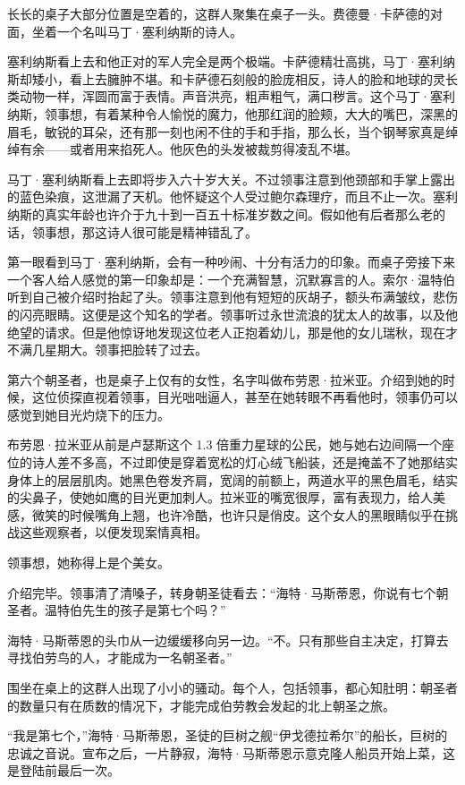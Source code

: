 \documentclass[AutoFakeBold=true]{book}
\begin{document}
长长的桌子大部分位置是空着的，这群人聚集在桌子一头。费德曼·卡萨德的对面，坐着一个名叫马丁·塞利纳斯的诗人。

塞利纳斯看上去和他正对的军人完全是两个极端。卡萨德精壮高挑，马丁·塞利纳斯却矮小，看上去臃肿不堪。和卡萨德石刻般的脸庞相反，诗人的脸和地球的灵长类动物一样，浑圆而富于表情。声音洪亮，粗声粗气，满口秽言。这个马丁·塞利纳斯，领事想，有着某种令人愉悦的魔力，他那红润的脸颊，大大的嘴巴，深黑的眉毛，敏锐的耳朵，还有那一刻也闲不住的手和手指，那么长，当个钢琴家真是绰绰有余——或者用来掐死人。他灰色的头发被裁剪得凌乱不堪。

马丁·塞利纳斯看上去即将步入六十岁大关。不过领事注意到他颈部和手掌上露出的蓝色染痕，这泄漏了天机。他怀疑这个人受过鲍尔森理疗，而且不止一次。塞利纳斯的真实年龄也许介于九十到一百五十标准岁数之间。假如他有后者那么老的话，领事想，那这诗人很可能是精神错乱了。

第一眼看到马丁·塞利纳斯，会有一种吵闹、十分有活力的印象。而桌子旁接下来一个客人给人感觉的第一印象却是：一个充满智慧，沉默寡言的人。索尔·温特伯听到自己被介绍时抬起了头。领事注意到他有短短的灰胡子，额头布满皱纹，悲伤的闪亮眼睛。这便是这个知名的学者。领事听过永世流浪的犹太人的故事，以及他绝望的请求。但是他惊讶地发现这位老人正抱着幼儿，那是他的女儿瑞秋，现在才不满几星期大。领事把脸转了过去。

第六个朝圣者，也是桌子上仅有的女性，名字叫做布劳恩·拉米亚。介绍到她的时候，这位侦探直视着领事，目光咄咄逼人，甚至在她转眼不再看他时，领事仍可以感觉到她目光灼烧下的压力。

布劳恩·拉米亚从前是卢瑟斯这个 1.3 倍重力星球的公民，她与她右边间隔一个座位的诗人差不多高，不过即使是穿着宽松的灯心绒飞船装，还是掩盖不了她那结实身体上的层层肌肉。她黑色卷发齐肩，宽阔的前额上，两道水平的黑色眉毛，结实的尖鼻子，使她如鹰的目光更加刺人。拉米亚的嘴宽很厚，富有表现力，给人美感，微笑的时候嘴角上翘，也许冷酷，也许只是俏皮。这个女人的黑眼睛似乎在挑战这些观察者，以便发现案情真相。

领事想，她称得上是个美女。

介绍完毕。领事清了清嗓子，转身朝圣徒看去：``海特·马斯蒂恩，你说有七个朝圣者。温特伯先生的孩子是第七个吗？''

海特·马斯蒂恩的头巾从一边缓缓移向另一边。``不。只有那些自主决定，打算去寻找伯劳鸟的人，才能成为一名朝圣者。''

围坐在桌上的这群人出现了小小的骚动。每个人，包括领事，都心知肚明：朝圣者的数量只有在质数的情况下，才能完成伯劳教会发起的北上朝圣之旅。

``我是第七个，''海特·马斯蒂恩，圣徒的巨树之舰``伊戈德拉希尔''的船长，巨树的忠诚之音说。宣布之后，一片静寂，海特·马斯蒂恩示意克隆人船员开始上菜，这是登陆前最后一次。
\end{document}
